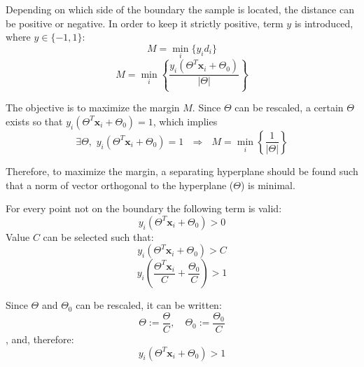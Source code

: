 \begin{appendix}
Depending on which side of the boundary the sample is located, the distance can be positive or negative. In order to keep it strictly positive, term $y$ is introduced, where $y \in \{-1,1\}$:
\begin{equation} 
M = \min_i \big\{y_id_i\big\}
\end{equation}
\begin{equation} 
M = \min_i \left\{ \frac{y_i \left(\Theta^T \mathbf{x}_i + \Theta_0\right)}{\left\vert \Theta \right\vert} \right\}
\end{equation}

The objective is to maximize the margin $M$. Since $\Theta$ can be rescaled, a certain $\Theta$ exists so that $y_i \left(\Theta^T \mathbf{x}_i + \Theta_0\right) = 1$, which implies
\begin{equation} 
\exists \Theta, \,\, y_i \left(\Theta^T \mathbf{x}_i + \Theta_0\right) = 1 \,\,\,\, \Rightarrow \,\,\,\, M = \min_i \left\{ \frac{1}{\left\vert \Theta \right\vert} \right\}
\end{equation}

\noindent Therefore, to maximize the margin, a separating hyperplane should be found such that a norm of vector orthogonal to the hyperplane ($\Theta$) is minimal. 

For every point not on the boundary the following term is valid:
\begin{equation} 
y_i \left(\Theta^T \mathbf{x}_i + \Theta_0\right) > 0 
\end{equation}
Value $C$ can be selected such that:
\begin{equation} 
y_i \left(\Theta^T \mathbf{x}_i + \Theta_0\right) > C
\end{equation}
\begin{equation} 
y_i \left(\frac{\Theta^T \mathbf{x}_i}{C} + \frac{\Theta_0}{C}\right) > 1
\end{equation}

Since $\Theta$ and $\Theta_0$ can be rescaled, it can be written:
\begin{equation} 
\Theta := \frac{\Theta}{C}, \,\,\,\,\,\, \Theta_0 := \frac{\Theta_0}{C}
\end{equation}
, and, therefore:
\begin{equation}  \label{eq:SVM-constraint}
 y_i \left(\Theta^T \mathbf{x}_i + \Theta_0\right) > 1
\end{equation}


\end{appendix}
